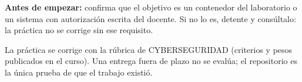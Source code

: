 \documentclass[11pt,a4paper]{article}
\begin{document}
\begin{tcolorbox}[cajaMejora]\textbf{Antes de empezar:} confirma que el objetivo es un contenedor del laboratorio o un sistema con autorización escrita del docente. Si no lo es, detente y consúltalo: la práctica no se corrige sin ese requisito.
\end{tcolorbox}

\begin{cajaRecuerda}La práctica se corrige con la rúbrica de CYBERSEGURIDAD (criterios y pesos publicados en el curso). Una entrega fuera de plazo no se evalúa; el repositorio es la única prueba de que el trabajo existió.
\end{cajaRecuerda}
\end{document}
